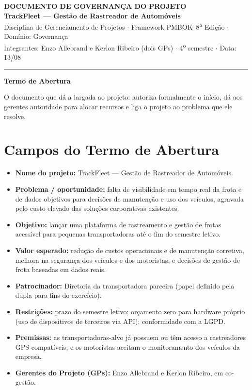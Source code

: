 \documentclass[11pt,a4paper]{article}
\newcommand{\cabecalho}[3]{%
  \begin{center}
  {\Large\bfseries DOCUMENTO DE #1 DO PROJETO}\\[2pt]
  {\large\bfseries TrackFleet --- Gestão de Rastreador de Automóveis}\\[4pt]
  Disciplina de Gerenciamento de Projetos $\cdot$ Framework PMBOK\textregistered\ 8\textsuperscript{a} Edição $\cdot$ Domínio: #2\\[2pt]
  Integrantes: Enzo Allebrand e Kerlon Ribeiro (dois GPs) $\cdot$ 4\textsuperscript{o} semestre $\cdot$ Data: #3
  \end{center}
  \vspace{2mm}\hrule\vspace{4mm}}
\newcommand{\parte}[1]{\noindent\textbf{\large #1}\par\vspace{1mm}}
\begin{document}
\cabecalho{GOVERNANÇA}{Governança}{13/08}

\parte{Termo de Abertura}
\noindent O documento que dá a largada ao projeto: autoriza formalmente o início, dá aos gerentes autoridade para alocar recursos e liga o projeto ao problema que ele resolve.

\section{Campos do Termo de Abertura}
\begin{itemize}[itemsep=4pt]
  \item \textbf{Nome do projeto:} TrackFleet --- Gestão de Rastreador de Automóveis.
  \item \textbf{Problema / oportunidade:} falta de visibilidade em tempo real da frota e de dados objetivos para decisões de manutenção e uso dos veículos, agravada pelo custo elevado das soluções corporativas existentes.
  \item \textbf{Objetivo:} lançar uma plataforma de rastreamento e gestão de frotas acessível para pequenas transportadoras até o fim do semestre letivo.
  \item \textbf{Valor esperado:} redução de custos operacionais e de manutenção corretiva, melhora na segurança dos veículos e dos motoristas, e decisões de gestão de frota baseadas em dados reais.
  \item \textbf{Patrocinador:} Diretoria da transportadora parceira (papel definido pela dupla para fins do exercício).
  \item \textbf{Restrições:} prazo do semestre letivo; orçamento zero para hardware próprio (uso de dispositivos de terceiros via API); conformidade com a LGPD.
  \item \textbf{Premissas:} as transportadoras-alvo já possuem ou têm acesso a rastreadores GPS compatíveis, e os motoristas aceitam o monitoramento dos veículos da empresa.
  \item \textbf{Gerentes do Projeto (GPs):} Enzo Allebrand e Kerlon Ribeiro, em co-gestão.
\end{itemize}
\end{document}
